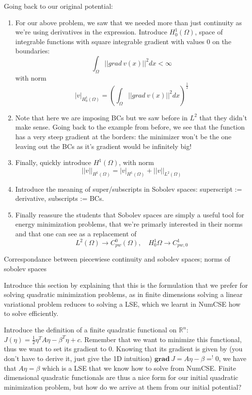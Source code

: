 Going back to our original potential:
\begin{enumerate}
    \item For our above problem, we saw that we needed more than just continuity as we're using derivatives in the expression. Introduce $H^1_0(\Omega)$, space of integrable functions with square integrable gradient with values 0 on the boundaries:
    $$\int_\Omega ||grad \ v(x)||^2 dx < \infty $$ 
    with norm
    $$|v|_{H^1_0(\Omega)} = (\int_\Omega ||grad \ v(x)||^2 dx)^\frac{1}{2}$$
    \item Note that here we are imposing BCs but we saw before in $L^2$ that they didn't make sense. Going back to the example from before, we see that the function has a very steep gradient at the borders: the minimizer won't be the one leaving out the BCs as it's gradient would be infinitely big!
    \item Finally, quickly introduce $H^1(\Omega)$, with norm
    $$||v||_{H^1(\Omega)} = |v|_{H^1(\Omega)} + ||v||_{L^2(\Omega)}$$
    \item Introduce the meaning of super/subscripts in Sobolev spaces: superscript := derivative, subscripts := BCs.
    \item Finally reassure the students that Sobolev spaces are simply a useful tool for energy minimization problems, that we're primarly interested in their norms and that one can see as a replacement of
    $$L^2(\Omega) \rightarrow C^0_{pw}(\Omega), \quad H^1_0{\Omega} \rightarrow C^1_{pw,0}$$
\end{enumerate}

Correspondance between piecewiese continuity and sobolev spaces; norms of sobolev spaces


Introduce this section by explaining that this is the formulation that we prefer for solving quadratic minimization problems, as in finite dimensions solving a linear variational problem reduces to solving a LSE, which we learnt in NumCSE how to solve efficiently. 

Introduce the definition of a finite quadratic functional on $\mathbb{R}^n$: $ J(\eta) = \frac{1}{2}\eta^TA\eta - \beta^T\eta + c$. Remember that we want to minimize this functional, thus we want to set its gradient to 0. Knowing that its gradient is given by (you don't have to derive it, just give the 1D intuition) $\textbf{grad} \ J = A\eta - \beta =^! 0 $, we have that $A\eta = \beta$ which is a LSE that we know how to solve from NumCSE. Finite dimensional quadratic functionals are thus a nice form for our initial quadratic minimization problem, but how do we arrive at them from our initial potential?


